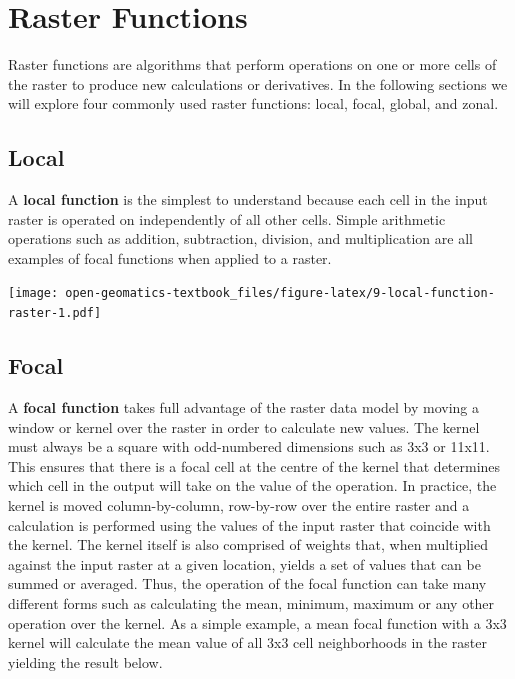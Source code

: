 \documentclass[
]{book}
\begin{document}
\hypertarget{raster-functions}{%
\section{Raster Functions}\label{raster-functions}}

Raster functions are algorithms that perform operations on one or more cells of the raster to produce new calculations or derivatives. In the following sections we will explore four commonly used raster functions: local, focal, global, and zonal.

\hypertarget{local}{%
\subsection{Local}\label{local}}

A \textbf{local function} is the simplest to understand because each cell in the input raster is operated on independently of all other cells. Simple arithmetic operations such as addition, subtraction, division, and multiplication are all examples of focal functions when applied to a raster.

\texttt{[image: open-geomatics-textbook\_files/figure-latex/9-local-function-raster-1.pdf]}

\hypertarget{focal}{%
\subsection{Focal}\label{focal}}

A \textbf{focal function} takes full advantage of the raster data model by moving a window or kernel over the raster in order to calculate new values. The kernel must always be a square with odd-numbered dimensions such as 3x3 or 11x11. This ensures that there is a focal cell at the centre of the kernel that determines which cell in the output will take on the value of the operation. In practice, the kernel is moved column-by-column, row-by-row over the entire raster and a calculation is performed using the values of the input raster that coincide with the kernel. The kernel itself is also comprised of weights that, when multiplied against the input raster at a given location, yields a set of values that can be summed or averaged. Thus, the operation of the focal function can take many different forms such as calculating the mean, minimum, maximum or any other operation over the kernel. As a simple example, a mean focal function with a 3x3 kernel will calculate the mean value of all 3x3 cell neighborhoods in the raster yielding the result below.
\end{document}

